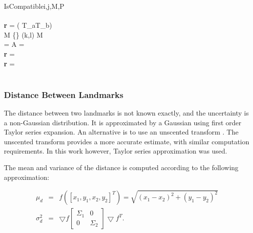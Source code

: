 \begin{pseudocode}{IsCompatible}{i,j,M,P}
  \\
  \\
  {\bf r} = \NOT \left( T_a\left[i\right] \OR T_b\left[j\right] \right)\\

   \AND M \ne \left\{\right\} \DO
  \BEGIN
     (k,l) \leftarrow M\\
     \left[E^a_{i,k}, E^b_{j,l}\right] = \TRUE \THEN
     \BEGIN
        A = \\
        {\bf r} = 
     \END\\
     \ELSE \BEGIN
        {\bf r} = \FALSE
     \END\\
  \END\\

\end{pseudocode}


\subsubsection{Distance Between Landmarks}

The distance between two landmarks is not known exactly, and the
uncertainty is a non-Gaussian distribution. It is approximated by a
Gaussian using first order Taylor series expansion. An alternative is to
use an unscented transform \cite{unscented}. The unscented transform
provides a more accurate estimate, with similar computation
requirements. In this work however, Taylor series approximation was
used.

The mean and variance of the distance is computed according to the
following approximation:

\begin{eqnarray}
  \mu_d  &=& f([x_1,y_1,x_2,y_2]^T) = \sqrt{(x_1-x_2)^2 + (y_1-y_2)^2}
\label{eqn:dist_estimate_mu}\\
 \sigma_{d}^2 &=& \bigtriangledown f \left [\begin {array}{cc} \Sigma_1 & 0\\
 0& \Sigma_2 \end{array}\right ] \bigtriangledown f^T.
\label{eqn:dist_estimate_cov}
\end{eqnarray}

